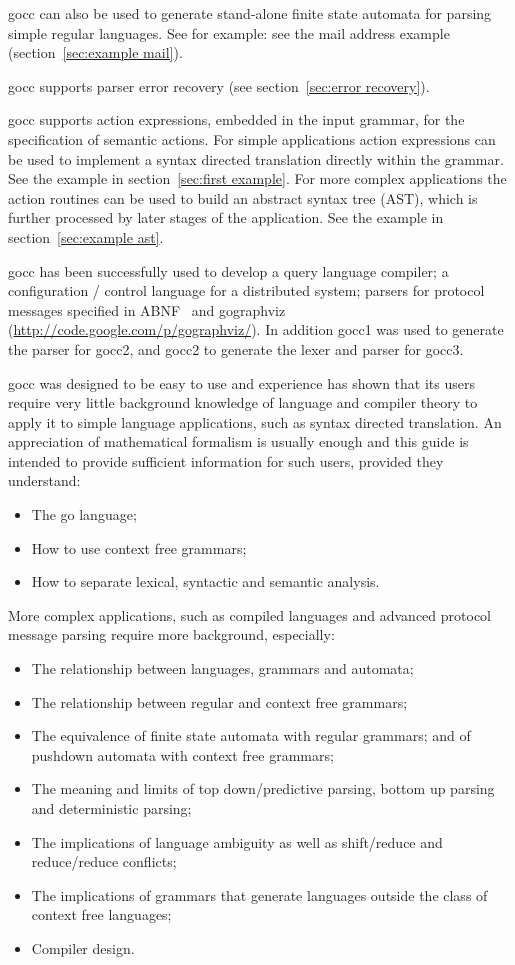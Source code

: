 \documentclass[12pt]{article}
\begin{document}
	gocc can also be used to generate stand-alone finite state automata for parsing simple regular languages. See for example: see the mail address example (section~\ref{sec:example mail}).

	gocc supports parser error recovery (see section~\ref{sec:error recovery}). 

	gocc supports action expressions, embedded in the input grammar, for the specification of semantic actions. For simple applications action expressions can be used to implement a syntax directed translation directly within the grammar. See the example in section~\ref{sec:first example}. For more complex applications the action routines can be used to build an abstract syntax tree (AST), which is further processed by later stages of the application. See the example in section~\ref{sec:example ast}.

	gocc has been successfully used to develop a query language compiler; a configuration / control language for a distributed system; parsers for protocol messages specified in ABNF~\cite{ABNF} and gographviz (\url{http://code.google.com/p/gographviz/}). In addition gocc1 was used to generate the parser for gocc2, and gocc2 to generate the lexer and parser for gocc3.

	gocc was designed to be easy to use and experience has shown that its users require very little background knowledge of language and compiler theory to apply it to simple language applications, such as syntax directed translation. An appreciation of mathematical formalism is usually enough and this guide is intended to provide sufficient information for such users, provided they understand:
	\begin{itemize}
		\item The go language;
		\item How to use context free grammars;
		\item How to separate lexical, syntactic and semantic analysis.
	\end{itemize}

	More complex applications, such as compiled languages and advanced protocol message parsing require more background, especially:
	\begin{itemize}
		\item The relationship between languages, grammars and automata;
		\item The relationship between regular and context free grammars;
		\item The equivalence of finite state automata with regular grammars; and of pushdown automata with context free grammars;
		\item The meaning and limits of top down/predictive parsing, bottom up parsing and deterministic parsing;
		\item The implications of language ambiguity as well as shift/reduce and reduce/reduce conflicts;
		\item The implications of grammars that generate languages outside the class of context free languages;
		\item Compiler design.
	\end{itemize}
\end{document}
